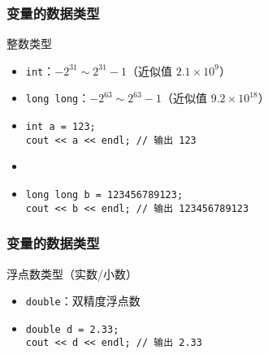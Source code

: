 \begin{frame}[fragile]
    \frametitle{变量的数据类型}

    \begin{block}{整数类型}

        \begin{itemize}
            \item \lstinline|int|：$-2^{31} \sim 2^{31} - 1$（近似值 $2.1 \times 10^9$）
            \item \lstinline|long long|：$-2^{63} \sim 2^{63} - 1$（近似值 $9.2 \times 10^{18}$）
        \end{itemize}

    \end{block}

    \begin{itemize}
        \item
            \lstinline|int a = 123;|\\
            \lstinline|cout << a << endl; // 输出 123|

        \item<2->

        \item<3->
            \lstinline|long long b = 123456789123;|\\
            \lstinline|cout << b << endl; // 输出 123456789123|
    \end{itemize}
\end{frame}

\begin{frame}[fragile]
    \frametitle{变量的数据类型}

    \begin{block}{浮点数类型（实数/小数）}

        \begin{itemize}
            \item \lstinline|double|：双精度浮点数
        \end{itemize}

    \end{block}

    \begin{itemize}
        \item
            \lstinline|double d = 2.33;|\\
            \lstinline|cout << d << endl; // 输出 2.33|
    \end{itemize}
\end{frame}

